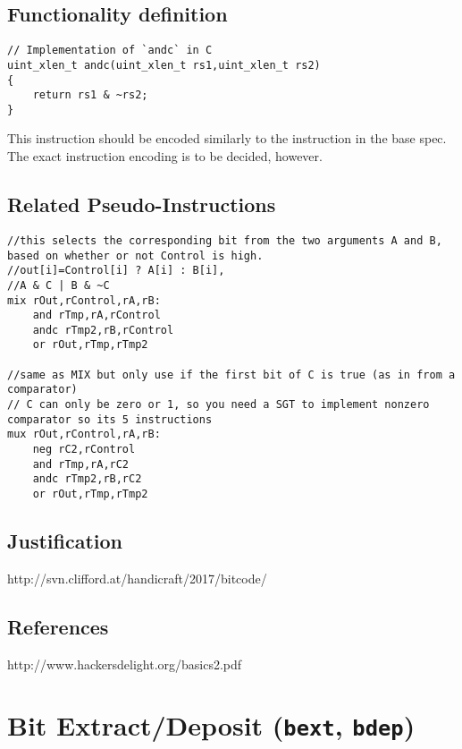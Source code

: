 \subsection{Functionality definition}

\begin{verbatim}
// Implementation of `andc` in C
uint_xlen_t andc(uint_xlen_t rs1,uint_xlen_t rs2)
{
    return rs1 & ~rs2;
}
\end{verbatim}

This instruction should be encoded similarly to the instruction in the
base spec. The exact instruction encoding is to be decided, however.

\subsection{Related Pseudo-Instructions}

\begin{verbatim}
//this selects the corresponding bit from the two arguments A and B, based on whether or not Control is high.
//out[i]=Control[i] ? A[i] : B[i],
//A & C | B & ~C
mix rOut,rControl,rA,rB:
    and rTmp,rA,rControl
    andc rTmp2,rB,rControl
    or rOut,rTmp,rTmp2

//same as MIX but only use if the first bit of C is true (as in from a comparator)
// C can only be zero or 1, so you need a SGT to implement nonzero comparator so its 5 instructions
mux rOut,rControl,rA,rB:
    neg rC2,rControl
    and rTmp,rA,rC2
    andc rTmp2,rB,rC2
    or rOut,rTmp,rTmp2
\end{verbatim}

\subsection{Justification}

http://svn.clifford.at/handicraft/2017/bitcode/

\subsection{References}

http://www.hackersdelight.org/basics2.pdf


\section{Bit Extract/Deposit (\texttt{bext}, \texttt{bdep})}

